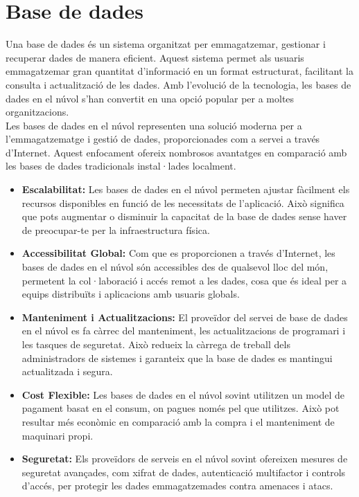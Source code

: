 \documentclass[a4paper,12pt,twoside]{ThesisStyle}
\begin{document}
\section{Base de dades}
\label{subsec: Base de dades}

Una base de dades és un sistema organitzat per emmagatzemar, gestionar i recuperar dades de manera eficient. Aquest sistema permet als usuaris emmagatzemar gran quantitat d'informació en un format estructurat, facilitant la consulta i actualització de les dades. Amb l'evolució de la tecnologia, les bases de dades en el núvol s'han convertit en una opció popular per a moltes organitzacions.\\

Les bases de dades en el núvol representen una solució moderna per a l'emmagatzematge i gestió de dades, proporcionades com a servei a través d'Internet. Aquest enfocament ofereix nombrosos avantatges en comparació amb les bases de dades tradicionals instal·lades localment.

\begin{itemize}
    \item \textbf{Escalabilitat:}
    Les bases de dades en el núvol permeten ajustar fàcilment els recursos disponibles en funció de les necessitats de l'aplicació. Això significa que pots augmentar o disminuir la capacitat de la base de dades sense haver de preocupar-te per la infraestructura física.
    
    \item \textbf{Accessibilitat Global:}
    Com que es proporcionen a través d'Internet, les bases de dades en el núvol són accessibles des de qualsevol lloc del món, permetent la col·laboració i accés remot a les dades, cosa que és ideal per a equips distribuïts i aplicacions amb usuaris globals.
    
    \item \textbf{Manteniment i Actualitzacions:}
    El proveïdor del servei de base de dades en el núvol es fa càrrec del manteniment, les actualitzacions de programari i les tasques de seguretat. Això redueix la càrrega de treball dels administradors de sistemes i garanteix que la base de dades es mantingui actualitzada i segura.
    
    \item \textbf{Cost Flexible:}
    Les bases de dades en el núvol sovint utilitzen un model de pagament basat en el consum, on pagues només pel que utilitzes. Això pot resultar més econòmic en comparació amb la compra i el manteniment de maquinari propi.
    
    \item \textbf{Seguretat:}
    Els proveïdors de serveis en el núvol sovint ofereixen mesures de seguretat avançades, com xifrat de dades, autenticació multifactor i controls d'accés, per protegir les dades emmagatzemades contra amenaces i atacs.
\end{itemize}
\end{document}

